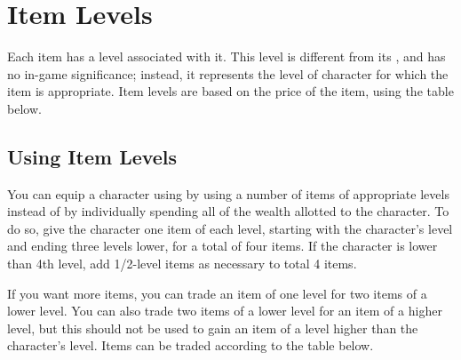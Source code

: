 \section{Item Levels}

Each item has a level associated with it. This level is different from its , and has no in-game significance; instead, it represents the level of character for which the item is appropriate. Item levels are based on the price of the item, using the table below.

\subsection{Using Item Levels}

You can equip a character using by using a number of items of appropriate levels instead of by individually spending all of the wealth allotted to the character. To do so, give the character one item of each level, starting with the character's level and ending three levels lower, for a total of four items. If the character is lower than 4th level, add 1/2-level items as necessary to total 4 items.

If you want more items, you can trade an item of one level for two items of a lower level.
You can also trade two items of a lower level for an item of a higher level, but this should not be used to gain an item of a level higher than the character's level.
Items can be traded according to the table below.

